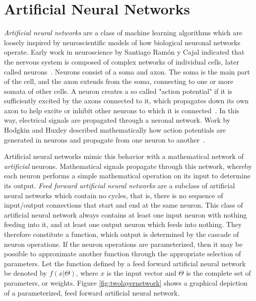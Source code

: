 \chapter{Artificial Neural Networks}
\label{chap:neuralnetworks}

\textit{Artificial neural networks} are a class of machine learning algorithms which are loosely inspired by neuroscientific models of how biological neuronal networks operate.
Early work in neuroscience by Santiago Ram{\'o}n y Cajal indicated that the nervous system is composed of complex networks of individual cells, later called neurons~\cite{cajal1955}.
Neurons consist of a soma and axon.
The soma is the main part of the cell, and the axon extends from the soma, connecting to one or more somata of other cells.
A neuron creates a so called "action potential" if it is sufficiently excited by the axons connected to it, which propagates down its own axon to help excite or inhibit other neurons to which it is connected~\cite{mcculloch1943}.
In this way, electrical signals are propagated through a neronal network.
Work by Hodgkin and Huxley described mathematically how action potentials are generated in neurons and propagate from one neuron to another~\cite{hodgkin1952}.

Artificial neural networks mimic this behavior with a mathematical network of \textit{artificial} neurons.
Mathematical signals propagate through this network, whereby each neuron performs a simple mathematical operation on its input to determine its output.
\textit{Feed forward artificial neural networks} are a subclass of artificial neural networks which contain no cycles, that is, there is no sequence of input/output connections that start and end at the same neuron.
This class of artificial neural network always contains at least one input neuron with nothing feeding into it, and at least one output neuron which feeds into nothing.
They therefore constitute a function, which output is determined by the cascade of neuron operations.
If the neuron operations are parameterized, then it may be possible to approximate another function through the appropriate selection of parameters.
Let the function defined by a feed forward artificial neural network be denoted by $f(x|\Theta)$, where $x$ is the input vector and $\Theta$ is the complete set of parameters, or weights. 
Figure \ref{fig:twolayernetwork} shows a graphical depiction of a parameterized, feed forward artificial neural network.

